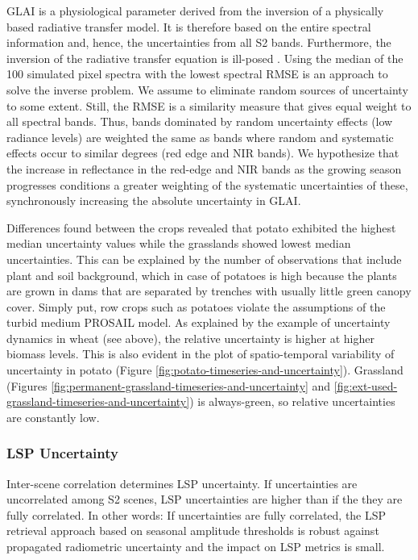 GLAI is a physiological parameter derived from the inversion of a physically based radiative transfer model. It is therefore based on the entire spectral information and, hence, the uncertainties from all \gls{S2} bands. Furthermore, the inversion of the radiative transfer equation is ill-posed \citep{zurita-milla_visualizing_2015}. Using the median of the 100 simulated pixel spectra with the lowest spectral RMSE is an approach to solve the inverse problem. We assume to eliminate random sources of uncertainty to some extent. Still, the RMSE is a similarity measure that gives equal weight to all spectral bands. Thus, bands dominated by random uncertainty effects (low radiance levels) are weighted the same as bands where random and systematic effects occur to similar degrees (red edge and NIR bands). We hypothesize that the increase in reflectance in the red-edge and NIR bands as the growing season progresses conditions a greater weighting of the systematic uncertainties of these, synchronously increasing the absolute uncertainty in GLAI.

Differences found between the crops revealed that potato exhibited the highest median uncertainty values while the grasslands showed lowest median uncertainties. This can be explained by the number of observations that include plant and soil background, which in case of potatoes is high because the plants are grown in dams that are separated by trenches with usually little green canopy cover. Simply put, row crops such as potatoes violate the assumptions of the turbid medium PROSAIL model. As explained by the example of uncertainty dynamics in wheat (see above), the relative uncertainty is higher at higher biomass levels. This is also evident in the plot of spatio-temporal variability of uncertainty in potato (Figure \ref{fig:potato-timeseries-and-uncertainty}). Grassland (Figures \ref{fig:permanent-grassland-timeseries-and-uncertainty} and \ref{fig:ext-used-grassland-timeseries-and-uncertainty}) is always-green, so relative uncertainties are constantly low.

\subsubsection{LSP Uncertainty}
\label{subsec:discussion-lsp-uncertainty}

Inter-scene correlation determines \gls{LSP} uncertainty. If uncertainties are uncorrelated among \gls{S2} scenes, \gls{LSP} uncertainties are higher than if the they are fully correlated. In other words: If uncertainties are fully correlated, the \gls{LSP} retrieval approach based on seasonal amplitude thresholds is robust against propagated radiometric uncertainty and the impact on \gls{LSP} metrics is small.

